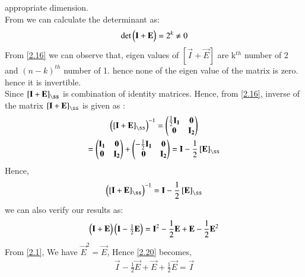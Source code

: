 \documentclass[journal,12pt,twocolumn]{IEEEtran}
\begin{document}
	appropriate dimension.\\
	From  we can calculate the determinant as:
	\begin{align}
	\text{det}\begin{pmatrix}\mathbf{I} + \mathbf{E}\end{pmatrix} = 2^k \neq  0
	\end{align}
	From \ref{2.16} we can observe that, eigen values of  $ \left[\vec{I}+ \vec{E} \right] $ are k$^{th}$ number of 2 and $(n-k)^{th}$ number of 1. hence  none of the eigen value  of the matrix is zero. hence it is invertible. \\
	Since $\left[ \vec{I} + \vec{E}\right]_{\ss}$ is combination of identity matrices. Hence, from \eqref{2.16}, inverse of the matrix  $\left[ \vec{I} + \vec{E}\right]_{\ss}$ is given as :
	\begin{multline}
	\myvec{\left[ \vec{I} + \vec{E}\right]_{\ss} }^{-1} = \myvec{\frac{1}{2}\vec{I_1} & \vec{0} \\ \vec{0} & \vec{I_2} }\\
	=   \myvec{\vec{I_1} & \vec{0} \\
		\vec{0} & \vec{I_2} } +  \myvec{-\frac{1}{2}\vec{I_1} & \vec{0} \\
		\vec{0} & \vec{I_2}} = \vec{I} - \frac{1}{2}\left[\vec{E}\right]_{\ss}
	\end{multline}
	Hence,
	\begin{align}
	\myvec{\left[ \vec{I} + \vec{E}\right]_{\ss} }^{-1} = \vec{I} - \frac{1}{2}\left[\vec{E}\right]_{\ss}
	\end{align}
	we can also verify our results as:
	\begin{multline}
	\begin{pmatrix}\mathbf{I} + \mathbf{E}\end{pmatrix}\begin{pmatrix}\mathbf{I} - \frac{1}{2}\mathbf{E}\end{pmatrix} = \mathbf{I}^2- \frac{1}{2}\mathbf{E} +\mathbf{E}- \frac{1}{2}\mathbf{E}^2 \label{2.20}
	\end{multline}
	From \eqref{2.1}, We have $\vec{E}^2 = \vec{E}$, Hence \eqref{2.20} becomes,
	\begin{align}
	\vec{I} - \frac{1}{2}\vec{E} +\vec{E} + \frac{1}{2}\vec{E} = \vec{I}
	\end{align}
	
\end{document}
